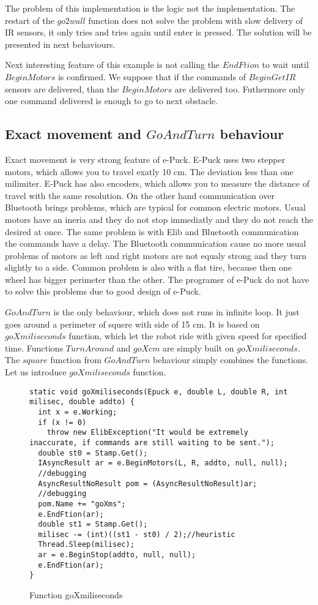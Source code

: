 	The problem of this implementation is the logic not the implementation. The restart of the $go2wall$ function
	does not solve the problem with slow delivery of IR sensors, it only tries and tries again until enter is pressed.
	The solution will be presented in next behaviours.

	Next interesting feature of this example is not calling the $EndFtion$ to wait until $BeginMotors$ is confirmed.
	We suppose that if the commands of $BeginGetIR$ sensors are delivered, than the $BeginMotors$ are delivered too.
	Futhermore only one command delivered is enough to go to next obstacle.

\subsection{Exact movement and $GoAndTurn$ behaviour} \label{sec:go}
	Exact movement is very strong feature of e-Puck. E-Puck uses two stepper motors,
	which allows you to travel exatly 10 cm. The deviation less than one milimiter.
	E-Puck has also encoders, which allows you to measure the distance of travel with the same resolution.
	On the other hand communication over Bluetooth brings problems, which are typical for common electric motors.
	Usual motors have an ineria and they do not stop immediatly and they do not reach the desired at once. The same problem is with 
	Elib and Bluetooth communication the commands have a delay.
	The Bluetooth communication cause no more usual problems of motors as left and right motors are not equaly strong and they
	turn slightly to a side. Common problem is also with a flat tire, because then one wheel has bigger perimeter than the other.
	The programer of e-Puck do not have to solve this problems due to good design of e-Puck.

	$GoAndTurn$ is the only behaviour, which does not runs in infinite loop. It just goes around a perimeter of squere with side
	of 15 cm. It is based on $goXmiliseconds$ function, which let the robot ride with given speed for specified time.
	Functions $TurnAround$ and $goXcm$ are simply built on $goXmiliseconds$. The $square$ function from $GoAndTurn$ behaviour
	simply combines the functions.
	Let us introduce $goXmiliseconds$ function.
\begin{figure}[!hbp]
\begin{lstlisting}
static void goXmiliseconds(Epuck e, double L, double R, int milisec, double addto) {
  int x = e.Working;
  if (x != 0)
    throw new ElibException("It would be extremely inaccurate, if commands are still waiting to be sent.");
  double st0 = Stamp.Get();
  IAsyncResult ar = e.BeginMotors(L, R, addto, null, null);
  //debugging
  AsyncResultNoResult pom = (AsyncResultNoResult)ar;
  //debugging
  pom.Name += "goXms";
  e.EndFtion(ar);
  double st1 = Stamp.Get();
  milisec -= (int)((st1 - st0) / 2);//heuristic
  Thread.Sleep(milisec);
  ar = e.BeginStop(addto, null, null);
  e.EndFtion(ar);
}
\end{lstlisting}
\caption{Function goXmiliseconds} \label{gox}
\end{figure}

